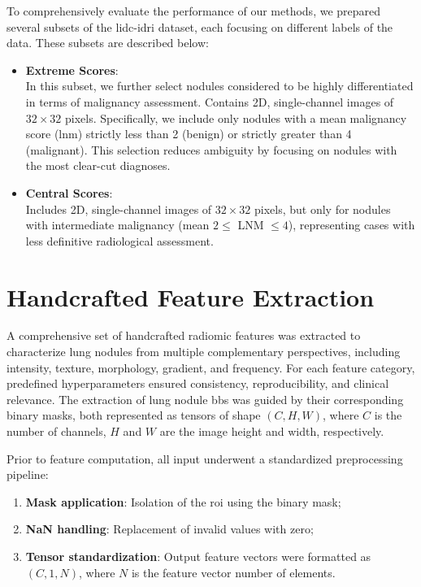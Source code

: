 To comprehensively evaluate the performance of our methods, we prepared several subsets of the \ac{lidc-idri} dataset, each focusing on different labels of the data. These subsets are described below:

        
\begin{itemize} 
    \item \textbf{Extreme Scores}:\\
    In this subset, we further select nodules considered to be highly differentiated in terms of malignancy assessment. Contains 2D, single-channel images of $32 \times 32$ pixels. Specifically, we include only nodules with a mean malignancy score (\ac{lnm}) strictly less than 2 (benign) or strictly greater than 4 (malignant). This selection reduces ambiguity by focusing on nodules with the most clear-cut diagnoses.
        
    \item \textbf{Central Scores}:\\
    Includes 2D, single-channel images of $32 \times 32$ pixels, but only for nodules with intermediate malignancy (mean $2 \leq$ LNM $\leq 4$), representing cases with less definitive radiological assessment.
\end{itemize}


\section{Handcrafted Feature Extraction}

A comprehensive set of handcrafted radiomic features was extracted to characterize lung nodules from multiple complementary perspectives, including intensity, texture, morphology, gradient, and frequency. For each feature category, predefined hyperparameters ensured consistency, reproducibility, and clinical relevance. The extraction of lung nodule \acp{bb} was guided by their corresponding binary masks, both represented as tensors of shape $(C, H, W)$, where $C$ is the number of channels, $H$ and $W$ are the image height and width, respectively.

Prior to feature computation, all input underwent a standardized preprocessing pipeline:
\begin{enumerate}
    \item \textbf{Mask application}: Isolation of the \ac{roi} using the binary mask;
    \item \textbf{NaN handling}: Replacement of invalid values with zero;
    \item \textbf{Tensor standardization}: Output feature vectors were formatted as $(C, 1, N)$, where $N$ is the feature vector number of elements.
\end{enumerate}


